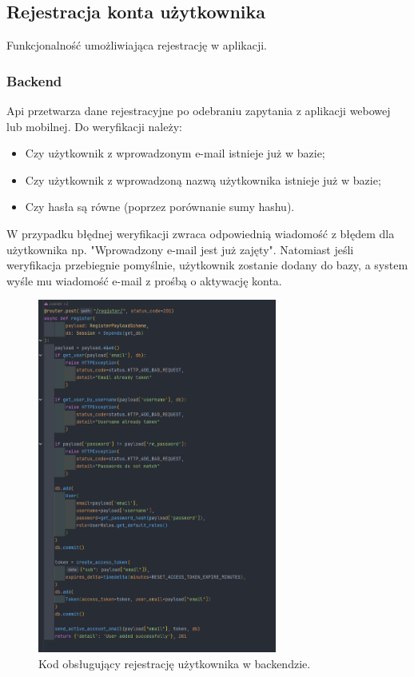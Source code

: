 
\subsection{Rejestracja konta użytkownika}
Funkcjonalność umożliwiająca rejestrację w aplikacji.

\subsubsection{Backend}
Api przetwarza dane rejestracyjne po odebraniu zapytania z aplikacji webowej lub mobilnej. Do weryfikacji należy:

\begin{itemize}
    \item Czy użytkownik z wprowadzonym e-mail istnieje już w bazie;
    \item Czy użytkownik z wprowadzoną nazwą użytkownika istnieje już w bazie;
    \item Czy hasła są równe (poprzez porównanie sumy hashu).
\end{itemize}

W przypadku błędnej weryfikacji zwraca odpowiednią wiadomość z błędem dla użytkownika np. "Wprowadzony e-mail jest już zajęty". Natomiast jeśli weryfikacja przebiegnie pomyślnie, użytkownik zostanie dodany do bazy, a system wyśle mu wiadomość e-mail z prośbą o aktywację konta.

\begin{figure}[H]
    \centering
    \includegraphics[width=0.7\textwidth]{chapters/chapter_8/screens/rejestracja_backend}
    \caption{Kod obsługujący rejestrację użytkownika w backendzie.}
    \label{img:rejestracja_backend}
\end{figure}

